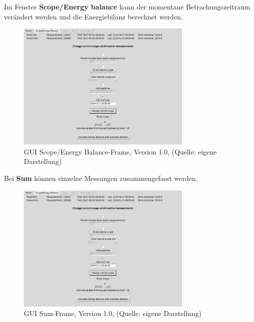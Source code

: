 \documentclass[11pt,a4paper]{article}
\newcommand{\guiplotsize}{0.75}
\newcommand{\guiversion}{1.0}
\begin{document}
Im Fenster \textbf{Scope/Energy balance} kann der momentane Betrachungszeitraum verändert werden und die Energiebilanz berechnet werden. 

\begin{figure}[H]
\centering
\includegraphics[width=\guiplotsize\textwidth]{pictures/GUI/Scope_Energy_Balance_Frame.png}
\caption[GUI Scope/Energy Balance-Frame, Version \guiversion]{GUI Scope/Energy Balance-Frame, Version \guiversion, (Quelle: eigene Darstellung)}
\label{fig:GUI Scope/Energy Balance-Frame}
\end{figure}

Bei \textbf{Sum} können einzelne Messungen zusammengefasst werden.

\begin{figure}[H]
\centering
\includegraphics[width=\guiplotsize\textwidth]{pictures/GUI/Scope_Energy_Balance_Frame.png}
\caption[GUI Sum-Frame, Version \guiversion]{GUI Sum-Frame, Version \guiversion, (Quelle: eigene Darstellung)}
\label{fig:GUI Sum-Frame}
\end{figure}
\end{document}
